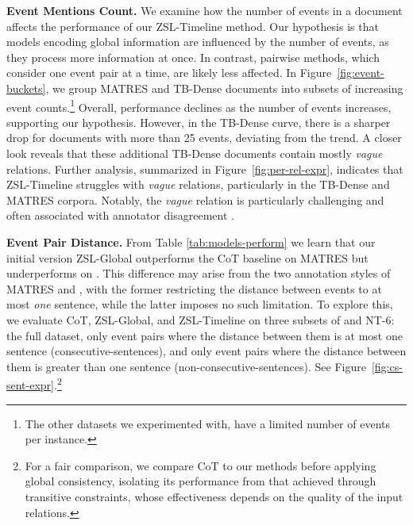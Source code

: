 \textbf{Event Mentions Count.}
We examine how the number of events in a document affects the performance of our ZSL-Timeline method. Our hypothesis is that models encoding global information are influenced by the number of events, as they process more information at once. In contrast, pairwise methods, which consider one event pair at a time, are likely less affected.  
In Figure~\ref{fig:event-buckets}, we group MATRES and TB-Dense documents into subsets of increasing event counts.\footnote{The other datasets we experimented with, have a limited number of events per instance.}  
Overall, performance declines as the number of events increases, supporting our hypothesis. However, in the TB-Dense curve, there is a sharper drop for documents with more than 25 events, deviating from the trend. A closer look reveals that these additional TB-Dense documents contain mostly \textit{vague} relations. Further analysis, summarized in Figure~\ref{fig:per-rel-expr}, indicates that ZSL-Timeline struggles with \textit{vague} relations, particularly in the TB-Dense and MATRES corpora. Notably, the \textit{vague} relation is particularly challenging and often associated with annotator disagreement \cite{chambers-etal-2014-dense}.





\textbf{Event Pair Distance.}
From Table \ref{tab:models-perform} we learn that our initial version ZSL-Global outperforms the CoT baseline on MATRES but underperforms on \App{}. 
This difference may arise from the two annotation styles of MATRES and \App{}, with the former restricting the distance between events to at most \textit{one} sentence, while the latter imposes no such limitation. To explore this, we evaluate CoT, ZSL-Global, and ZSL-Timeline on three subsets of \App{} and NT-6: the full dataset, only event pairs where the distance between them is at most one sentence (consecutive-sentences), and only event pairs where the distance between them is greater than one sentence (non-consecutive-sentences). See Figure~\ref{fig:cs-sent-expr}.\footnote{For a fair comparison, we compare CoT to our methods before applying global consistency, isolating its performance from that achieved through transitive constraints, whose effectiveness depends on the quality of the input relations.}


